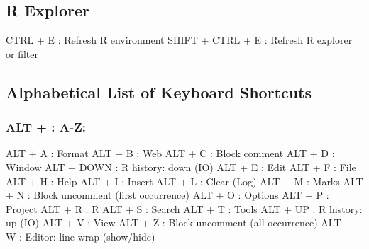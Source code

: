 \hypertarget{basic_card_rexplorer}{}
\subsection{R Explorer}

\vspace{-0.5cm}
\begin{Rtables}[caption={[R explorer keyboard shortcuts]
    R explorer keyboard shortcuts},
  label=shortcut:rexplorer]
  CTRL  + E               : Refresh R environment
  SHIFT + CTRL + E        : Refresh R explorer or filter
\end{Rtables}


\hypertarget{basic_card_alphabetical}{}
\subsection{Alphabetical List of Keyboard Shortcuts}


\subsubsection{ALT + : A-Z:}

\vspace{-0.5cm}
\begin{Rtables}[caption={[ALT keyboard shortcuts]
    ALT Keyboard Shortcuts},
  label=shortcut:alt]
  ALT + A                 : Format
  ALT + B                 : Web
  ALT + C                 : Block comment
  ALT + D                 : Window
  ALT + DOWN              : R history: down (IO)
  ALT + E                 : Edit
  ALT + F                 : File
  ALT + H                 : Help
  ALT + I                 : Insert
  ALT + L                 : Clear (Log)
  ALT + M                 : Marks
  ALT + N                 : Block uncomment (first occurrence)
  ALT + O                 : Options
  ALT + P                 : Project
  ALT + R                 : R
  ALT + S                 : Search
  ALT + T                 : Tools
  ALT + UP                : R history: up (IO)
  ALT + V                 : View
  ALT + Z                 : Block uncomment (all occurrence)
  ALT + W                 : Editor: line wrap (show/hide)
\end{Rtables}


